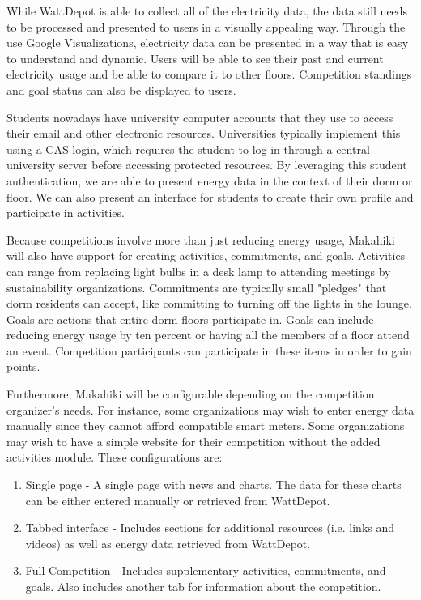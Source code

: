 While WattDepot is able to collect all of the electricity data, the data still needs to be processed and presented to users in a visually appealing way.  Through the use Google Visualizations, electricity data can be presented in a way that is easy to understand and dynamic.  Users will be able to see their past and current electricity usage and be able to compare it to other floors.  Competition standings and goal status can also be displayed to users.

Students nowadays have university computer accounts that they use to access their email and other electronic resources.  Universities typically implement this using a CAS login, which requires the student to log in through a central university server before accessing protected resources.  By leveraging this student authentication, we are able to present energy data in the context of their dorm or floor.  We can also present an interface for students to create their own profile and participate in activities.

Because competitions involve more than just reducing energy usage, Makahiki will also have support for creating activities, commitments, and goals.  Activities can range from replacing light bulbs in a desk lamp to attending meetings by sustainability organizations.  Commitments are typically small "pledges" that dorm residents can accept, like committing to turning off the lights in the lounge.  Goals are actions that entire dorm floors participate in.  Goals can include reducing energy usage by ten percent or having all the members of a floor attend an event.  Competition participants can participate in these items in order to gain points.

Furthermore, Makahiki will be configurable depending on the competition organizer's needs.  For instance, some organizations may wish to enter energy data manually since they cannot afford compatible smart meters.  Some organizations may wish to have a simple website for their competition without the added activities module.  These configurations are:

\begin{enumerate}
	\item Single page - A single page with news and charts.  The data for these charts can be either entered manually or retrieved from WattDepot.
	\item Tabbed interface - Includes sections for additional resources (i.e. links and videos) as well as energy data retrieved from WattDepot.
	\item Full Competition - Includes supplementary activities, commitments, and goals.  Also includes another tab for information about the competition.
\end{enumerate}

